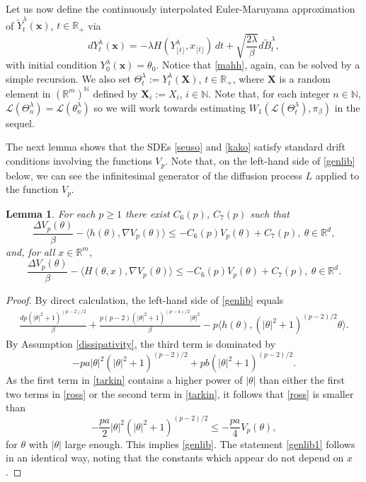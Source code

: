 \documentclass[a4paper,draft]{article}
\newtheorem{lemma}[theorem]{Lemma}
\begin{document}
Let us now define the continuously interpolated
Euler-Maruyama approximation of $\tilde{Y}^{\lambda}_t(\mathbf{x})$, $t\in\mathbb{R}_+$ via
\begin{equation}\label{mahh}
dY^{\lambda}_t(\mathbf{x})=-\lambda H(Y^{\lambda}_{\lfloor t\rfloor},{x}_{\lfloor t\rfloor})\, dt
+ \sqrt{\frac{2\lambda}{\beta}} d\tilde{B}^{\lambda}_{t},
\end{equation}
with initial condition $Y^{\lambda}_0(\mathbf{x})=\theta_0$.
Notice that \eqref{mahh}, again, can be solved by a simple recursion.
We also set $\Theta_t^{\lambda}:=Y^{\lambda}_t(\mathbf{X})$, $t\in\mathbb{R}_+$,
where $\mathbf{X}$ is a random element in $(\mathbb{R}^m)^{\mathbb{N}}$
defined by $\mathbf{X}_i:=X_i$, $i\in\mathbb{N}$.
Note that, for each integer $n\in\mathbb{N}$, $\mathcal{L}({\Theta}^{\lambda}_n)=\mathcal{L}(\theta_n^{\lambda})$ so we will work towards estimating $W_1(\mathcal{L}(\Theta^{\lambda}_t),\pi_{\beta})$
in the sequel.



The next lemma shows that the SDEs \eqref{seuso} and \eqref{kako} satisfy standard drift conditions 
involving the functions $V_p$. Note that, on the left-hand side of \eqref{genlib} below,
we can see the infinitesimal generator of the diffusion process $L$ applied to
the function $V_p$.

\begin{lemma}\label{lyapp} For each $p\geq 1$ there exist
$C_6(p)$, $C_7(p)$
such that
\begin{equation}\label{genlib}
\frac{\Delta V_p(\theta)}{\beta}-\langle h(\theta),\nabla V_p(\theta)\rangle\leq
-C_6(p) V_p(\theta)+C_7(p),\ \theta\in\mathbb{R}^d,
\end{equation}
and, for all $x\in\mathbb{R}^m$,
\begin{equation}\label{genlib1}
\frac{\Delta V_p(\theta)}{\beta}-\langle H(\theta,x),\nabla V_p(\theta)\rangle\leq
-C_6(p) V_p(\theta)+C_7(p),\ \theta\in\mathbb{R}^d.
\end{equation}
\end{lemma}
\begin{proof}
By direct calculation, the left-hand side of \eqref{genlib} equals
\begin{eqnarray}\label{ross}
\frac{dp(|\theta|^2+1)^{(p-2)/2}}{\beta}+\frac{p(p-2)(|\theta|^2+1)^{(p-4)/2}|\theta|^2}{\beta}-
p\langle h(\theta),(|\theta|^2+1)^{(p-2)/2}\theta\rangle.
\end{eqnarray}
By Assumption \ref{dissipativity}, the third term is dominated by
\begin{equation}\label{tarkin}
-pa |\theta|^2(|\theta|^2+1)^{(p-2)/2}+pb(|\theta|^2+1)^{(p-2)/2}.
\end{equation}
As the first term in \eqref{tarkin} contains a higher power
of $|\theta|$ than either the first two terms in \eqref{ross} or
the second term in \eqref{tarkin},
it follows that \eqref{ross} is smaller than
$$
-\frac{pa}{2} |\theta|^2(|\theta|^2+1)^{(p-2)/2}\leq -\frac{pa}{4}V_p(\theta),
$$
for $\theta$ with $|\theta|$ large enough. This implies \eqref{genlib}.
The statement \eqref{genlib1} follows in an identical way, noting that the 
constants which appear do not depend on $x$.
\end{proof}
\end{document}
